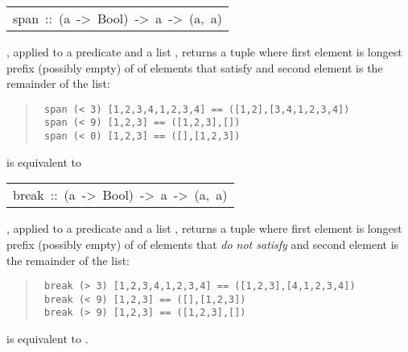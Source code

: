 \begin{haddockdesc}
\item[\begin{tabular}{@{}l}
span\ ::\ (a\ ->\ Bool)\ ->\ {\char 91}a{\char 93}\ ->\ ({\char 91}a{\char 93},\ {\char 91}a{\char 93})
\end{tabular}]\haddockbegindoc
{}, applied to a predicate  and a list , returns a tuple where
 first element is longest prefix (possibly empty) of  of elements that
 satisfy  and second element is the remainder of the list:
\par
\begin{quote}
{\haddockverb\begin{verbatim}
 span (< 3) [1,2,3,4,1,2,3,4] == ([1,2],[3,4,1,2,3,4])
 span (< 9) [1,2,3] == ([1,2,3],[])
 span (< 0) [1,2,3] == ([],[1,2,3])
\end{verbatim}}
\end{quote}
  is equivalent to 
\par

\end{haddockdesc}
\begin{haddockdesc}
\item[\begin{tabular}{@{}l}
break\ ::\ (a\ ->\ Bool)\ ->\ {\char 91}a{\char 93}\ ->\ ({\char 91}a{\char 93},\ {\char 91}a{\char 93})
\end{tabular}]\haddockbegindoc
{}, applied to a predicate  and a list , returns a tuple where
 first element is longest prefix (possibly empty) of  of elements that
 \emph{do not satisfy}  and second element is the remainder of the list:
\par
\begin{quote}
{\haddockverb\begin{verbatim}
 break (> 3) [1,2,3,4,1,2,3,4] == ([1,2,3],[4,1,2,3,4])
 break (< 9) [1,2,3] == ([],[1,2,3])
 break (> 9) [1,2,3] == ([1,2,3],[])
\end{verbatim}}
\end{quote}
  is equivalent to .
\par

\end{haddockdesc}
